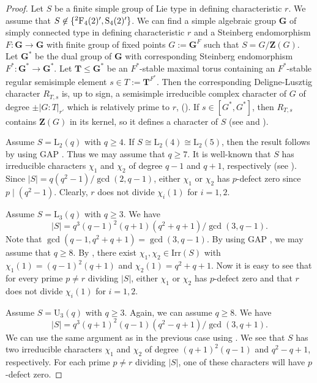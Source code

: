 \documentclass[twoside,a4paper,reqno,12pt]{amsart}
\newcommand{\<}{\langle}
\renewcommand{\>}{\rangle}
\newcommand{\leqs}{\leqslant}
\newcommand{\PSU}{\mathrm {U}}
\newcommand{\PSL}{\mathrm {L}}
\newcommand{\PSp}{\mathrm {S}}
\newcommand{\ZB}{\mathbf{Z}}
\newcommand{\Irr}{\mathrm {Irr}}
\renewcommand{\leq}{\leqs}
\renewcommand{\:}{\colon}
\theoremstyle{definition}
\begin{document}
 \begin{proof}  Let $S$ be a finite simple group of Lie type in defining characteristic $r$. We assume that $S\not\in \{ {}^2{\rm F}_4(2)',\PSp_4(2)'\}$. We can find a simple algebraic group  $\mathbf{G}$ of simply connected type in defining characteristic $r$ and a Steinberg endomorphism $F: \mathbf{G}\rightarrow \mathbf{G}$   with finite group of fixed points   $G:=\mathbf{G}^F$ such that $S=G/\ZB(G)$. Let $\mathbf{G}^*$ be the dual group of $\mathbf{G}$ with corresponding Steinberg endomorphism  $F^*: \mathbf{G}^*\rightarrow \mathbf{G}^*$. Let $\mathbf{T}\leq \mathbf{G}^*$ be an $F^*$-stable maximal torus containing an $F^*$-stable regular semisimple element $s\in T:=\mathbf{T}^{F^*}$. Then the corresponding Deligne-Lusztig character $R_{T,s}$ is, up to sign, a semisimple  irreducible complex character of $G$ of degree $\pm|G:T|_{r'}$ which is relatively prime to $r$, (\cite[Corollary 7.3.5]{Carter}). If $s\in [G^*,G^*]$, then $R_{T,s}$ contains $\ZB(G)$ in its kernel, so it defines a character of $S$ (see \cite{Lusztig} and \cite[p. 174]{Malle}).
   
 Assume $S=\PSL_2(q)$ with $q\ge 4$. If $S\cong \PSL_2(4)\cong\PSL_2(5)$, then the result follows by using GAP \cite{GAP}. Thus we may assume that $q\ge 7$. It is well-known that $S$ has irreducible characters $\chi_1$ and $\chi_2$ of degree $q-1$ and $q+1$, respectively (see \cite[Theorems 38.1, 38.2]{Dornhoff}). Since $|S|=q(q^2-1)/\gcd(2,q-1)$, either $\chi_1$ or $\chi_2$ has $p$-defect zero since $p\mid (q^2-1).$ Clearly, $r$ does not divide $\chi_i(1)$ for $i=1,2.$
 
 Assume $S=\PSL_3(q)$ with $q\ge 3.$ We have $$|S|=q^3(q-1)^2(q+1)(q^2+q+1)/\gcd(3,q-1).$$ Note that $\gcd(q-1,q^2+q+1)=\gcd(3,q-1)$. By using GAP \cite{GAP}, we may assume that $q\ge 8$.  By \cite[Table 2]{SF}, there exist $\chi_1,\chi_2\in\Irr(S)$ with $\chi_1(1)=(q-1)^2(q+1)$ and $\chi_2(1)=q^2+q+1$. Now it is easy to see that  for every prime $p\neq r$ dividing $|S|$, either $\chi_1$ or $\chi_2$ has $p$-defect zero and that $r$ does not divide $\chi_i(1)$ for $i=1,2$. 
 
 Assume $S=\PSU_3(q)$ with $q\ge 3.$ Again, we can assume  $q \ge 8$. We have $$|S|=q^3(q+1)^2(q-1)(q^2-q+1)/\gcd(3,q+1).$$ We can use the same argument as in the previous case using \cite{SF}. We see that $S$ has two irreducible characters $\chi_1$ and $\chi_2$ of degree $(q+1)^2(q-1)$ and $q^2-q+1$, respectively. For each prime $p\neq r$ dividing $|S|$, one of these characters will have $p$-defect zero.
 

\end{proof}
\end{document}
